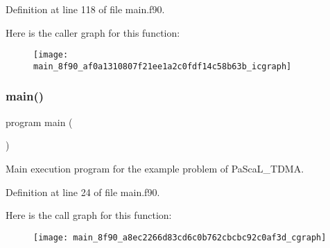 Definition at line 118 of file main.\+f90.

Here is the caller graph for this function\+:
\nopagebreak
\begin{figure}[H]
\begin{center}
\leavevmode
\texttt{[image: main\_8f90\_af0a1310807f21ee1a2c0fdf14c58b63b\_icgraph]}
\end{center}
\end{figure}
\mbox{\label{main_8f90_a8ec2266d83cd6c0b762cbcbc92c0af3d}} 
\subsubsection{\texorpdfstring{main()}{main()}}
{\footnotesize\ttfamily program main (\begin{DoxyParamCaption}{ }\end{DoxyParamCaption})}



Main execution program for the example problem of Pa\+Sca\+L\+\_\+\+T\+D\+MA. 



Definition at line 24 of file main.\+f90.

Here is the call graph for this function\+:
\nopagebreak
\begin{figure}[H]
\begin{center}
\leavevmode
\texttt{[image: main\_8f90\_a8ec2266d83cd6c0b762cbcbc92c0af3d\_cgraph]}
\end{center}
\end{figure}
